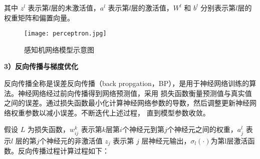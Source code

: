 其中 $z^{l}$ 表示第$l$层的未激活值，$a^{l}$ 表示第$l$层的激活值，$W^{l}$ 和 $b^{l}$ 分别表示第$l$层的权重矩阵和偏置向量。
\begin{figure}
  \centering
  \texttt{[image: perceptron.jpg]}
  \caption{感知机网络模型示意图}
  \label{fig:perceptron}
\end{figure}

\textbf{3）反向传播与梯度优化}

反向传播全称是误差反向传播（back propgation，BP），是用于神经网络训练的算法。神经网络经过前向传播得到网络预测值，采用
损失函数衡量预测值与真实值之间的误差。通过损失函数最小化计算神经网络参数的导数，然后调整更新神经网络权重参数以减小误差。不断迭代上述过程，
直到模型参数收敛。

假设 $L$ 为损失函数，$w_{ij}^k$ 表示第$k$层第$i$个神经元到第$j$个神经元之间的权重，$a_j^l$ 表示$l$ 层的第$j$个神经元的非激活值
$z_j$ 表示第 $j$ 层神经元输出，$\sigma_l(\cdot)$为第l层激活函数。反向传播过程计算过程如下：
